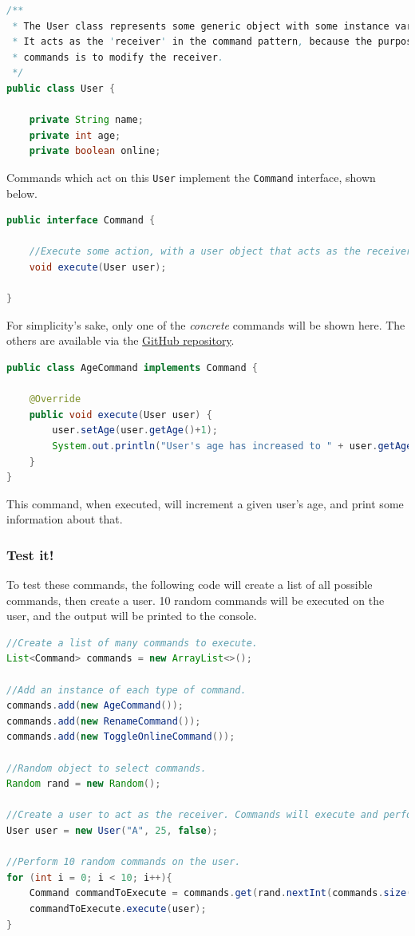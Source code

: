 \documentclass{article}
\begin{document}
	    		\begin{lstlisting}[language=java]
/**
 * The User class represents some generic object with some instance variables.
 * It acts as the 'receiver' in the command pattern, because the purpose of
 * commands is to modify the receiver.
 */
public class User {

    private String name;
    private int age;
    private boolean online;
	    		\end{lstlisting}

	    		Commands which act on this \verb|User| implement the \verb|Command| interface, shown below.

	    		\begin{lstlisting}[language=java]
public interface Command {

    //Execute some action, with a user object that acts as the receiver.
    void execute(User user);

}
	    		\end{lstlisting}

	    		For simplicity's sake, only one of the \textit{concrete} commands will be shown here. The others are available via the \href{https://github.com/andrewlalis/CommandPatternTutorial}{GitHub repository}.

	    		\begin{lstlisting}[language=java]
public class AgeCommand implements Command {

    @Override
    public void execute(User user) {
        user.setAge(user.getAge()+1);
        System.out.println("User's age has increased to " + user.getAge());
    }
}
	    		\end{lstlisting}

	    		This command, when executed, will increment a given user's age, and print some information about that.

		    \subsubsection{Test it!}
	    		To test these commands, the following code will create a list of all possible commands, then create a user. 10 random commands will be executed on the user, and the output will be printed to the console.

	    		\begin{lstlisting}[language=java]
//Create a list of many commands to execute.
List<Command> commands = new ArrayList<>();

//Add an instance of each type of command.
commands.add(new AgeCommand());
commands.add(new RenameCommand());
commands.add(new ToggleOnlineCommand());

//Random object to select commands.
Random rand = new Random();

//Create a user to act as the receiver. Commands will execute and perform an action on the receiver.
User user = new User("A", 25, false);

//Perform 10 random commands on the user.
for (int i = 0; i < 10; i++){
    Command commandToExecute = commands.get(rand.nextInt(commands.size()));
    commandToExecute.execute(user);
}
	    		\end{lstlisting}
\end{document}
